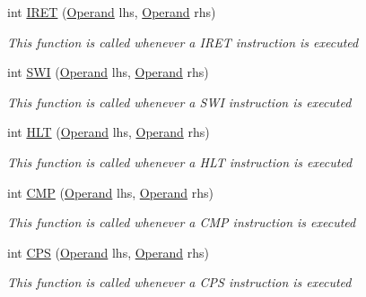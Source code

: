 \begin{DoxyCompactItemize}
int \hyperlink{class_c_p_u___o_s___simulator_1_1_c_p_u_1_1_instruction_aeabe3a18108036ab1a6bef4868406c84}{I\+R\+E\+T} (\hyperlink{class_c_p_u___o_s___simulator_1_1_c_p_u_1_1_operand}{Operand} lhs, \hyperlink{class_c_p_u___o_s___simulator_1_1_c_p_u_1_1_operand}{Operand} rhs)
\begin{DoxyCompactList}\small\item\em This function is called whenever a I\+R\+E\+T instruction is executed \end{DoxyCompactList}\item 
int \hyperlink{class_c_p_u___o_s___simulator_1_1_c_p_u_1_1_instruction_a90bf1f586341fa978113368bcc5c85a2}{S\+W\+I} (\hyperlink{class_c_p_u___o_s___simulator_1_1_c_p_u_1_1_operand}{Operand} lhs, \hyperlink{class_c_p_u___o_s___simulator_1_1_c_p_u_1_1_operand}{Operand} rhs)
\begin{DoxyCompactList}\small\item\em This function is called whenever a S\+W\+I instruction is executed \end{DoxyCompactList}\item 
int \hyperlink{class_c_p_u___o_s___simulator_1_1_c_p_u_1_1_instruction_a0e2e9739a7e365f24fd690c0033bb416}{H\+L\+T} (\hyperlink{class_c_p_u___o_s___simulator_1_1_c_p_u_1_1_operand}{Operand} lhs, \hyperlink{class_c_p_u___o_s___simulator_1_1_c_p_u_1_1_operand}{Operand} rhs)
\begin{DoxyCompactList}\small\item\em This function is called whenever a H\+L\+T instruction is executed \end{DoxyCompactList}\item 
int \hyperlink{class_c_p_u___o_s___simulator_1_1_c_p_u_1_1_instruction_a680092159bb5618a07049546887f1073}{C\+M\+P} (\hyperlink{class_c_p_u___o_s___simulator_1_1_c_p_u_1_1_operand}{Operand} lhs, \hyperlink{class_c_p_u___o_s___simulator_1_1_c_p_u_1_1_operand}{Operand} rhs)
\begin{DoxyCompactList}\small\item\em This function is called whenever a C\+M\+P instruction is executed \end{DoxyCompactList}\item 
int \hyperlink{class_c_p_u___o_s___simulator_1_1_c_p_u_1_1_instruction_aeb0024d3aa33977e8f4d747fc8a30b35}{C\+P\+S} (\hyperlink{class_c_p_u___o_s___simulator_1_1_c_p_u_1_1_operand}{Operand} lhs, \hyperlink{class_c_p_u___o_s___simulator_1_1_c_p_u_1_1_operand}{Operand} rhs)
\begin{DoxyCompactList}\small\item\em This function is called whenever a C\+P\+S instruction is executed \end{DoxyCompactList}\item 

\end{DoxyCompactItemize}

